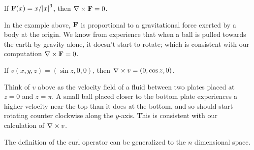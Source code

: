 
  \begin{exa}
    If $\mathbf{ F}(x) = x / \abs{x}^3$, then $\nabla \times \mathbf{ F} = 0$.
  \end{exa}

  \begin{remark}
    In the example above, $\mathbf{ F}$ is proportional to a gravitational force exerted by a body at the origin.
    We know from experience that when a ball is pulled towards the earth by gravity alone, it doesn't start to rotate; which is consistent with our computation $\nabla \times \mathbf{ F}  = 0$.
  \end{remark}

  \begin{exa}
    If $v(x, y, z) = (\sin z, 0, 0)$, then $\nabla \times v = (0, \cos z, 0 )$.
  \end{exa}
  \begin{remark}
    Think of $v$ above as the velocity field of a fluid between two plates placed at $z = 0$ and $z = \pi$.
    A small ball placed closer to the bottom plate experiences a higher velocity near the top than it does at the bottom, and so should start rotating counter clockwise along the $y$-axis.
    This is consistent with our calculation of $\nabla \times v$.
  \end{remark}
  
  
The definition of the curl operator can be generalized to the $n$ dimensional space.


